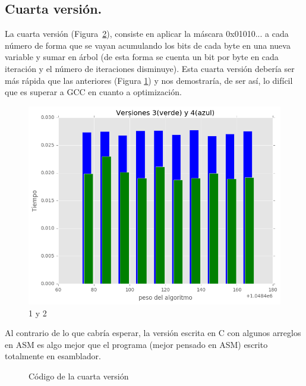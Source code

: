 \documentclass[a4paper, 11pt]{article}
\begin{document}
\subsection{Cuarta versión.}
La cuarta versión (Figura~\ref{cuarta versión}), consiste en aplicar la máscara 0x01010... a cada número de forma que se vayan acumulando los bits de cada byte en una nueva variable y sumar en árbol (de esta forma se cuenta un bit por byte en cada iteración y el número de iteraciones disminuye). Esta cuarta versión debería ser más rápida que las anteriores (Figura \ref{3y4}) y nos demostraría, de ser así, lo difícil que es superar a GCC en cuanto a optimización. 

\begin{figure}[!hbp]
	\includegraphics[scale=0.6]{3y4.png}
	\caption{1 y 2	\label{3y4}}
\end{figure}

Al contrario de lo que cabría esperar, la versión escrita en C con algunos arreglos en ASM es algo mejor que el programa (mejor pensado en ASM) escrito totalmente en esamblador. 

\begin{figure}[!hbp]
	
	\caption{Código de la cuarta versión \label{cuarta versión}}
\end{figure}
\end{document}
